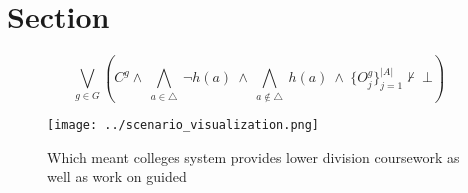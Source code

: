 \documentclass[a4paper]{article}
\begin{document}
\section{Section}

\[\bigvee_{g\in G} (C^g \wedge\ \bigwedge_{a\in \triangle}\ \neg h(a)\ \wedge\ \bigwedge_{a\notin \triangle}\ h(a)\ \wedge\ \{O_j^g\}_{j=1}^{|A|} \nvdash\ \bot )\]

\begin{figure}
\centering
\texttt{[image: ../scenario\_visualization.png]}
\caption{Which meant colleges system provides lower division coursework as well as work on guided 
}
\end{figure}
 
\end{document}
